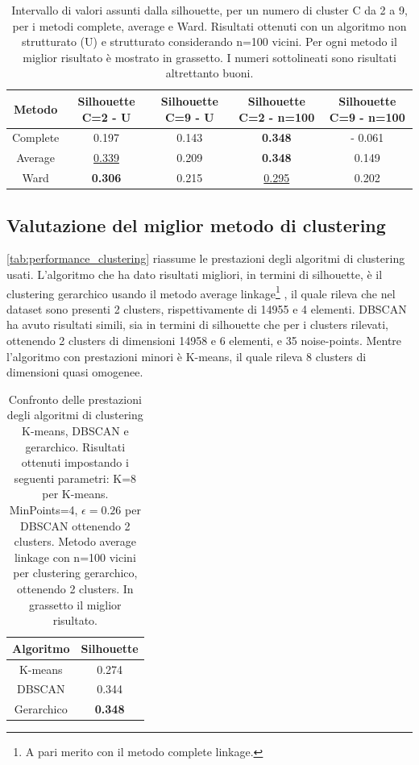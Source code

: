\documentclass[a4paper]{article}
\begin{document}
\begin{table}
\caption{Intervallo di valori assunti dalla silhouette, per un numero di cluster C da 2 a 9, per i metodi complete, average e Ward. Risultati ottenuti con un algoritmo non strutturato (U) e strutturato considerando n=100 vicini. Per ogni metodo il miglior risultato è mostrato in grassetto. I numeri sottolineati sono risultati altrettanto buoni.}

\begin{tabular}{|c|c|c|c|c|}
\hline 
Metodo & Silhouette C=2 - U & Silhouette C=9 - U & Silhouette C=2 - n=100 & Silhouette C=9 - n=100 \\ 
\hline 
Complete & 0.197 & 0.143 & \textbf{0.348} & - 0.061 \\ 
\hline 
Average & \underline{0.339} & 0.209 & \textbf{0.348} & 0.149 \\ 
\hline 
Ward & \textbf{0.306} & 0.215 & \underline{0.295} & 0.202 \\ 
\hline 
\end{tabular}
\label{tab:hierarchical_silhouette}
\end{table}

\subsection{Valutazione del miglior metodo di clustering}
\autoref{tab:performance_clustering} riassume le prestazioni degli algoritmi di clustering usati. L'algoritmo che ha dato risultati migliori, in termini di silhouette, è il clustering gerarchico usando il metodo average linkage\footnote{A pari merito con il metodo complete linkage.} , il quale rileva che nel dataset sono presenti 2 clusters, rispettivamente di 14955 e 4 elementi. DBSCAN ha avuto risultati simili, sia in termini di silhouette che per i clusters rilevati, ottenendo 2 clusters di dimensioni 14958 e 6 elementi, e 35 noise-points. Mentre l'algoritmo con prestazioni minori è K-means, il quale rileva 8 clusters di dimensioni quasi omogenee. 

\begin{table}
\caption{Confronto delle prestazioni degli algoritmi di clustering K-means, DBSCAN e gerarchico. Risultati ottenuti impostando i seguenti parametri: K=8 per K-means. MinPoints=4, $\epsilon=0.26$ per DBSCAN ottenendo 2 clusters. Metodo average linkage con n=100 vicini per clustering gerarchico, ottenendo 2 clusters. In grassetto il miglior risultato.}

\begin{tabular}{c|c}
Algoritmo & Silhouette \\
\hline 
K-means & 0.274 \\ 
DBSCAN & 0.344 \\ 
Gerarchico & \textbf{0.348} \\ 
\hline 
\end{tabular} 
\label{tab:performance_clustering}
\end{table}
\end{document}
